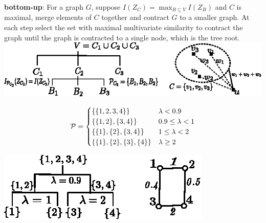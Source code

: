 \documentclass[portrait,final,archE,fontscale=0.3]{baposter}
\begin{document}
\begin{poster}
{\textbf{bottom-up}: For a graph $G$, suppose $I(Z_C) = \max_{B\subseteq V} I(Z_B)$ and $C$ is maximal, merge elements of $C$ together and contract $G$ to a smaller graph. At each step select the set with maximal multivariate similarity to contract the graph until the graph is contracted to a single node, which is the tree root. \\

\includegraphics[width=0.9\linewidth]{img/two_approach.eps}

\begin{equation*}
	\P = 
	\begin{cases}
		\{\{1,2,3,4\}\} & \lambda < 0.9 \\
		\{\{1,2\},\{3,4\}\} & 0.9 \leq \lambda < 1 \\
		\{\{1\},\{2\},\{3,4\}\} & 1 \leq \lambda < 2\\
		\{\{1\},\{2\},\{3\},\{4\}\} & \lambda \geq 2
	\end{cases}
\end{equation*}

\includegraphics[width=0.77\linewidth]{img/threshold.eps}
}

\end{poster}
\end{document}
